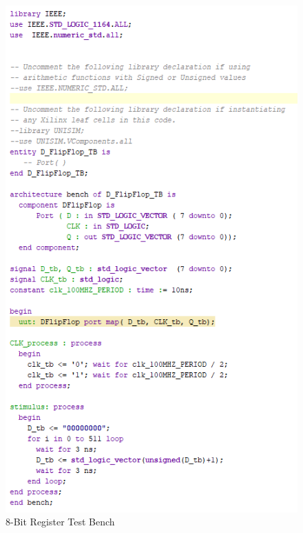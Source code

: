 \documentclass{article}
\begin{document}
\begin{figure}[h]
\begin{center}
\includegraphics[width=1\textwidth]{8BitRegisterSimSource.png} %
\caption{8-Bit Register Test Bench}
\end{center}
\end{figure}
\end{document}
